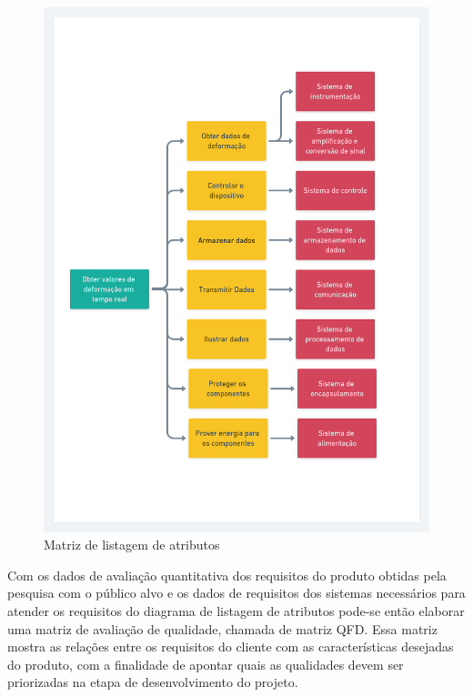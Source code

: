 \begin{figure}[htb]
	\caption{\label{fig:2031} Matriz de listagem de atributos}
	\begin{center}
		\includegraphics[width=\textwidth]{pictures/2031.png}
	\end{center}
\end{figure}

Com os dados de avaliação quantitativa dos requisitos do produto obtidas pela pesquisa com o público alvo e os dados de requisitos dos sistemas necessários para atender os requisitos do diagrama de listagem de
atributos pode-se então elaborar uma matriz de avaliação de qualidade, chamada de matriz QFD. Essa matriz mostra as relações entre os requisitos do cliente com as características desejadas do produto,
com a finalidade de apontar quais as qualidades devem ser priorizadas na etapa de desenvolvimento do projeto.

